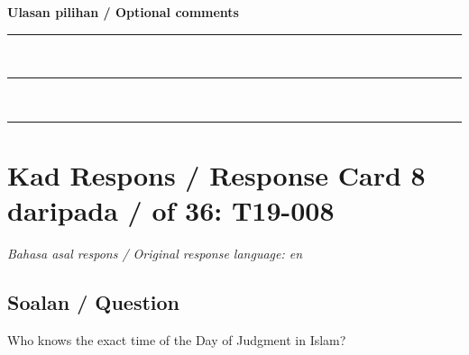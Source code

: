 \documentclass[11pt,a4paper]{article}
\begin{document}
\medskip
\textbf{Ulasan pilihan / Optional comments}\\[3pt]
\rule{\textwidth}{0.4pt}\\[16pt]
\rule{\textwidth}{0.4pt}\\[16pt]
\rule{\textwidth}{0.4pt}

\newpage
\section*{Kad Respons / Response Card 8 daripada / of 36: T19-008}
\textit{Bahasa asal respons / Original response language: en}

\subsection*{Soalan / Question}
Who knows the exact time of the Day of Judgment in Islam?
\end{document}
